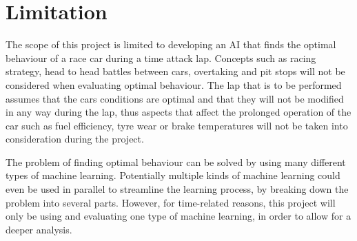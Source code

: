 





\section{Limitation}


The scope of this project is limited to developing an AI that finds the optimal behaviour of a race car during a time attack lap. Concepts such as racing strategy, head to head battles between cars, overtaking and pit stops will not be considered when evaluating optimal behaviour. The lap that is to be performed assumes that the cars conditions are optimal and that they will not be modified in any way during the lap, thus aspects that affect the prolonged operation of the car such as fuel efficiency, tyre wear or brake temperatures will not be taken into consideration during the project.

The problem of finding optimal behaviour can be solved by using many different types of machine learning. Potentially multiple kinds of machine learning could even be used in parallel to streamline the learning process, by breaking down the problem into several parts. However, for time-related reasons, this project will only be using and evaluating one type of machine learning, in order to allow for a deeper analysis.

